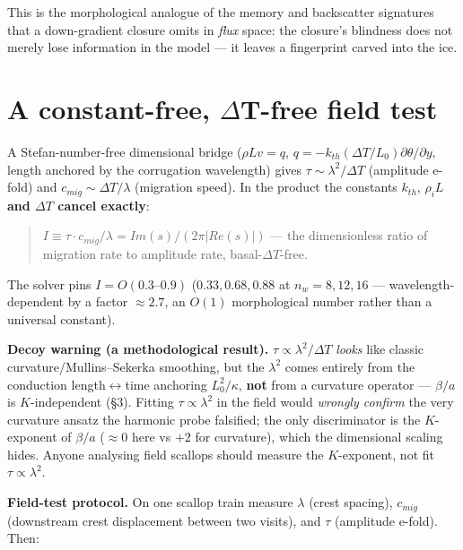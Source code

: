 \documentclass[tc, manuscript]{copernicus}
\begin{document}
This is the morphological analogue of the memory and backscatter signatures that a down-gradient closure omits in \emph{flux} space: the closure's blindness does not merely lose information in the model — it leaves a fingerprint carved into the ice.

\section{A constant-free, \ensuremath{\Delta}T-free field test}

A Stefan-number-free dimensional bridge ($\rho L v = q$, $q=-k_{th}(\Delta T/L_{0})\partial \theta /\partial y$, length anchored by the corrugation wavelength) gives $\tau  \sim  \lambda ^{2}/\Delta T$ (amplitude e-fold) and $c_{mig} \sim  \Delta T/\lambda $ (migration speed). In the product the constants $k_{th}$, $\rho _{i}L$ \textbf{and $\Delta T$ cancel exactly}:

\begin{quote}
$I \equiv  \tau \cdot c_{mig}/\lambda  = Im(s)/(2\pi |Re(s)|)$ — the dimensionless ratio of migration rate to amplitude rate, basal-$\Delta T$-free.
\end{quote}

The solver pins $I=O(0.3\mbox{--}0.9)$ ($0.33, 0.68, 0.88$ at $n_{w}=8,12,16$ — wavelength-dependent by a factor $\approx 2.7$, an $O(1)$ morphological number rather than a universal constant).

\textbf{Decoy warning (a methodological result).} $\tau  \propto  \lambda ^{2}/\Delta T$ \emph{looks} like classic curvature/Mullins–Sekerka smoothing, but the $\lambda ^{2}$ comes entirely from the conduction length\ensuremath{\leftrightarrow}time anchoring $L_{0}^{2}/\kappa $, \textbf{not} from a curvature operator — $\beta /a$ is $K$-independent (§3). Fitting $\tau \propto \lambda ^{2}$ in the field would \emph{wrongly confirm} the very curvature ansatz the harmonic probe falsified; the only discriminator is the $K$-exponent of $\beta /a$ ($\approx 0$ here vs $+2$ for curvature), which the dimensional scaling hides. Anyone analysing field scallops should measure the $K$-exponent, not fit $\tau \propto \lambda ^{2}$.

\textbf{Field-test protocol.} On one scallop train measure $\lambda $ (crest spacing), $c_{mig}$ (downstream crest displacement between two visits), and $\tau $ (amplitude e-fold). Then:
\end{document}
